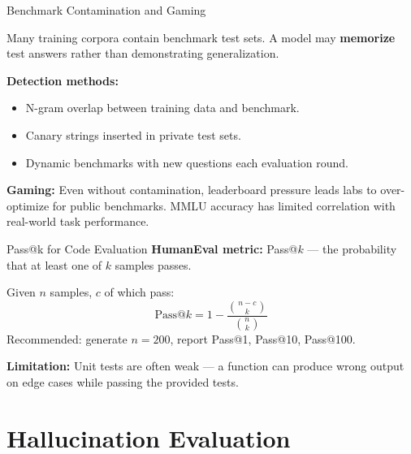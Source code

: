 \documentclass[aspectratio=169,10pt]{beamer}
\begin{document}
\begin{frame}{Benchmark Contamination and Gaming}
  \begin{tcolorbox}[alertbox, title=Critical Problem: Benchmark Contamination]
    Many training corpora contain benchmark test sets.
    A model may \textbf{memorize} test answers rather than demonstrating generalization.
  \end{tcolorbox}
  \vspace{0.4em}
  \textbf{Detection methods:}
  \begin{itemize}
    \item N-gram overlap between training data and benchmark.
    \item Canary strings inserted in private test sets.
    \item Dynamic benchmarks with new questions each evaluation round.
  \end{itemize}
  \vspace{0.3em}
  \textbf{Gaming:} Even without contamination, leaderboard pressure leads labs to
  over-optimize for public benchmarks. MMLU accuracy has limited correlation
  with real-world task performance.
\end{frame}

\begin{frame}{Pass@k for Code Evaluation}
  \textbf{HumanEval metric:} Pass@$k$ — the probability that at least one of $k$ samples passes.
  \vspace{0.4em}
  \begin{tcolorbox}[hitbox, title=Unbiased Estimator (Chen et al.\ 2021)]
    Given $n$ samples, $c$ of which pass:
    \[
      \text{Pass@}k = 1 - \frac{\binom{n-c}{k}}{\binom{n}{k}}
    \]
    Recommended: generate $n=200$, report Pass@1, Pass@10, Pass@100.
  \end{tcolorbox}
  \vspace{0.3em}
  \textbf{Limitation:} Unit tests are often weak — a function can produce wrong output on edge
  cases while passing the provided tests.
\end{frame}

\section{Hallucination Evaluation}
\end{document}
